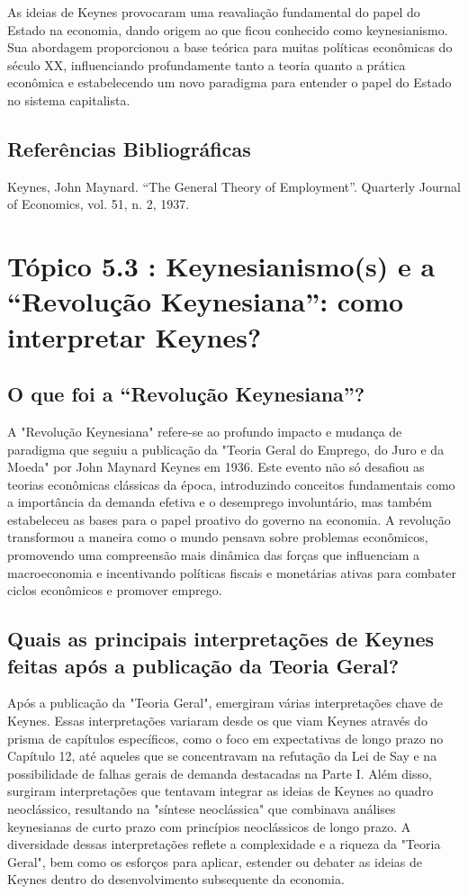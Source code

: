 \documentclass[a4paper,12pt]{article}[abntex2]
\begin{document}
As ideias de Keynes provocaram uma reavaliação fundamental do papel do Estado na economia, dando origem ao que ficou conhecido como keynesianismo. Sua abordagem proporcionou a base teórica para muitas políticas econômicas do século XX, influenciando profundamente tanto a teoria quanto a prática econômica e estabelecendo um novo paradigma para entender o papel do Estado no sistema capitalista.

\subsection{\textbf{Referências Bibliográficas}}
Keynes, John Maynard. “The General Theory of Employment”. Quarterly Journal of Economics,
vol. 51, n. 2, 1937.

\newpage
\section{\textbf{Tópico 5.3 : Keynesianismo(s) e a “Revolução Keynesiana”: como interpretar Keynes?}}
\subsection{\textbf{O que foi a “Revolução Keynesiana”?}}
A "Revolução Keynesiana" refere-se ao profundo impacto e mudança de paradigma que seguiu a publicação da "Teoria Geral do Emprego, do Juro e da Moeda" por John Maynard Keynes em 1936. Este evento não só desafiou as teorias econômicas clássicas da época, introduzindo conceitos fundamentais como a importância da demanda efetiva e o desemprego involuntário, mas também estabeleceu as bases para o papel proativo do governo na economia. A revolução transformou a maneira como o mundo pensava sobre problemas econômicos, promovendo uma compreensão mais dinâmica das forças que influenciam a macroeconomia e incentivando políticas fiscais e monetárias ativas para combater ciclos econômicos e promover emprego.
\subsection{\textbf{Quais as principais interpretações de Keynes feitas após a publicação da Teoria Geral?}}
Após a publicação da "Teoria Geral", emergiram várias interpretações chave de Keynes. Essas interpretações variaram desde os que viam Keynes através do prisma de capítulos específicos, como o foco em expectativas de longo prazo no Capítulo 12, até aqueles que se concentravam na refutação da Lei de Say e na possibilidade de falhas gerais de demanda destacadas na Parte I. Além disso, surgiram interpretações que tentavam integrar as ideias de Keynes ao quadro neoclássico, resultando na "síntese neoclássica" que combinava análises keynesianas de curto prazo com princípios neoclássicos de longo prazo. A diversidade dessas interpretações reflete a complexidade e a riqueza da "Teoria Geral", bem como os esforços para aplicar, estender ou debater as ideias de Keynes dentro do desenvolvimento subsequente da economia.
\end{document}
